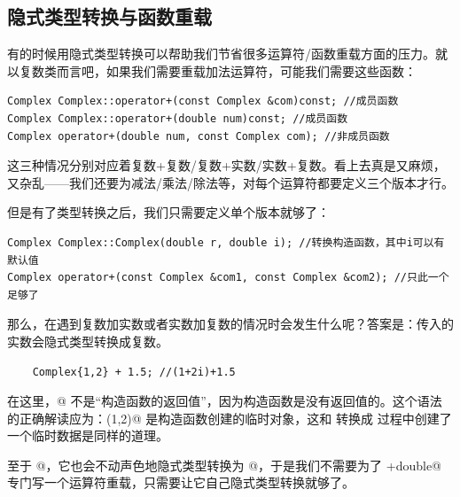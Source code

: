 \subsection*{隐式类型转换与函数重载}
有的时候用隐式类型转换可以帮助我们节省很多运算符/函数重载方面的压力。就以复数类而言吧，如果我们需要重载加法运算符，可能我们需要这些函数：
\begin{lstlisting}
Complex Complex::operator+(const Complex &com)const; //成员函数
Complex Complex::operator+(double num)const; //成员函数
Complex operator+(double num, const Complex com); //非成员函数
\end{lstlisting}
这三种情况分别对应着复数+复数/复数+实数/实数+复数。看上去真是又麻烦，又杂乱——我们还要为减法/乘法/除法等，对每个运算符都要定义三个版本才行。\par
但是有了类型转换之后，我们只需要定义单个版本就够了：
\begin{lstlisting}
Complex Complex::Complex(double r, double i); //转换构造函数，其中i可以有默认值
Complex operator+(const Complex &com1, const Complex &com2); //只此一个足够了
\end{lstlisting}
那么，在遇到复数加实数或者实数加复数的情况时会发生什么呢？答案是：传入的实数会隐式类型转换成复数。
\begin{lstlisting}
    Complex{1,2} + 1.5; //(1+2i)+1.5
\end{lstlisting}
在这里，@ 不是``构造函数的返回值''，因为构造函数是没有返回值的。这个语法的正确解读应为：\lstinline@Complex(1,2)@ 是构造函数创建的临时对象，这和 \lstinline@int@ 转换成 \lstinline@double@ 过程中创建了一个临时数据是同样的道理。\par
至于 @，它也会不动声色地隐式类型转换为 @，于是我们不需要为了 \lstinline@Complex+double@ 专门写一个运算符重载，只需要让它自己隐式类型转换就够了。\par
